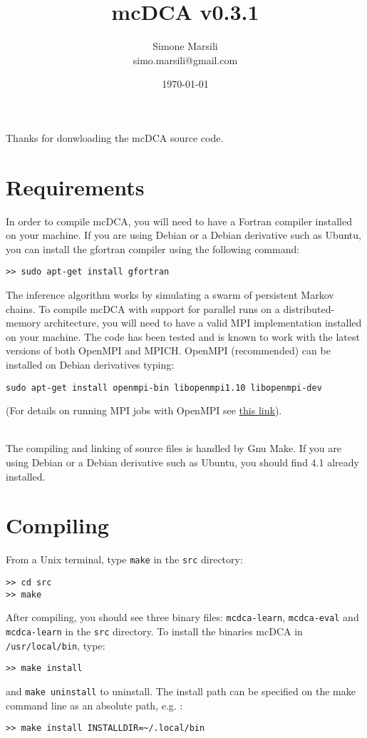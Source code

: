 \documentclass[a4paper,onecolumn]{article}
\title{mcDCA v0.3.1}
\author{
        Simone Marsili \\
        simo.marsili@gmail.com
}
\date{\today}
\begin{document}
\maketitle

Thanks for donwloading the mcDCA source code.

\section{Requirements}
\label{sec:requirements}

In order to compile mcDCA, you will need to have a Fortran compiler installed on your machine.   
If you are using Debian or a Debian derivative such as Ubuntu, you can install the gfortran compiler using the following command:
\begin{verbatim}
>> sudo apt-get install gfortran
\end{verbatim}

The inference algorithm works by simulating a swarm of persistent Markov chains. 
To compile mcDCA with support for parallel runs on a distributed-memory architecture,
you will need to have a valid MPI implementation installed on your machine. 
The code has been tested and is known to work with the latest versions of both OpenMPI and MPICH.   
OpenMPI (recommended) can be installed on Debian derivatives typing:
\begin{verbatim}
sudo apt-get install openmpi-bin libopenmpi1.10 libopenmpi-dev
\end{verbatim}
(For details on running MPI jobs with OpenMPI see \href{https://www.open-mpi.org/faq/?category=running}{this link}).
\\\

The compiling and linking of source files is handled by Gnu Make. 
If you are using Debian or a Debian derivative such as Ubuntu, you should find 4.1 already installed.

\section{Compiling}
\label{sec:compiling}
From a Unix terminal, type \verb|make| in the \verb|src| directory:
\begin{verbatim}
>> cd src
>> make
\end{verbatim}
After compiling, you should see three binary files: \verb|mcdca-learn|, \verb|mcdca-eval| and \verb|mcdca-learn| in the \verb|src| directory. 
To install the binaries mcDCA in \verb|/usr/local/bin|, type:
\begin{verbatim}
>> make install
\end{verbatim}
and \verb|make uninstall| to uninstall.
The install path can be specified on the make command line as an absolute path,
e.g. :
\begin{verbatim}
>> make install INSTALLDIR=~/.local/bin
\end{verbatim}
\end{document}
